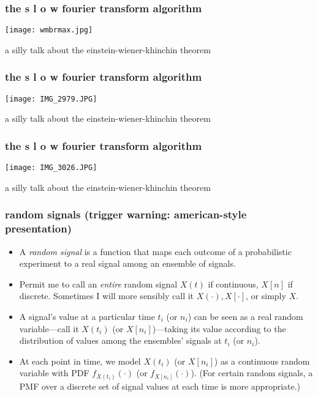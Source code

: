 \documentclass{beamer}
\begin{document}
\begin{frame}[fragile]
\frametitle{the s  l  o  w fourier transform algorithm}
\begin{center}
\texttt{[image: wmbrmax.jpg]}
\end{center}
\textcolor{title}{\begin{flushright} a silly talk about the einstein-wiener-khinchin theorem \end{flushright}}
\end{frame}

\begin{frame}[fragile]
\frametitle{the s  l  o  w fourier transform algorithm}
\begin{center}
\texttt{[image: IMG\_2979.JPG]}
\end{center}
\textcolor{title}{\begin{flushright} a silly talk about the einstein-wiener-khinchin theorem \end{flushright}}
\end{frame}

\begin{frame}[fragile]
\frametitle{the s  l  o  w fourier transform algorithm}
\begin{center}
\texttt{[image: IMG\_3026.JPG]}
\end{center}
\textcolor{title}{\begin{flushright} a silly talk about the einstein-wiener-khinchin theorem \end{flushright}}
\end{frame}




\begin{frame}
	\frametitle{random signals (trigger warning: american-style presentation)}
	\begin{itemize}%
		\item A \textit{random signal} is a function that maps each outcome of a probabilistic experiment to a real signal among an ensemble of signals.
		\item Permit me to call an \emph{entire} random signal $X(t)$ if continuous, $X[n]$ if discrete. Sometimes I will more sensibly call it $X(\cdot), X[\cdot]$, or simply $X$.
		\item A signal's value at a particular time $t_i$ (or $n_i$) can be seen as a real random variable---call it $X(t_i)$ (or $X[n_i]$)---taking its value according to the distribution of values among the ensembles' signals at $t_i$ (or $n_i$).
		\item At each point in time, we model $X(t_i)$ (or $X[n_i]$) as a continuous random variable with PDF $f_{X(t_i)}(\cdot)$ (or $f_{X[n_i]}(\cdot)$). (For certain random signals, a PMF over a discrete set of signal values at each time is more appropriate.)
	\end{itemize}

\end{frame}
\end{document}
